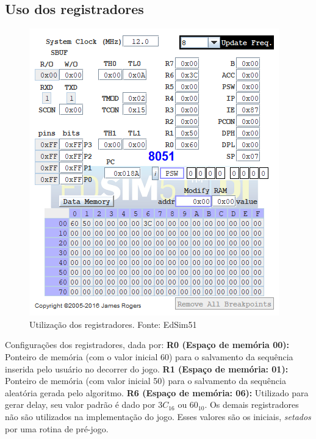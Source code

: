 \documentclass{article}
\begin{document}
\subsection{Uso dos registradores}
\begin{figure}[H]
\includegraphics[scale=1]{registradores.PNG}
\caption{Utilização dos registradores. Fonte: EdSim51}
\end{figure}
Configurações dos registradores, dada por:\newline
\textbf{R0 (Espaço de memória 00):} Ponteiro de memória (com o valor inicial 60) para o salvamento da sequência inserida pelo usuário no decorrer do jogo. \newline
\textbf{R1 (Espaço de memória: 01):} Ponteiro de memória (com valor inicial 50) para o salvamento da sequência aleatória gerada pelo algoritmo. \newline
\textbf{R6 (Espaço de memória: 06):} Utilizado para gerar delay, seu valor padrão é dado por $3C_{16}$ ou $60_{10}$.
\newline
Os demais registradores não são utilizados na implementação do jogo. Esses valores são os iniciais, \textit{setados} por uma rotina de pré-jogo.
\end{document}

